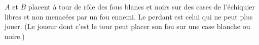 $A$ et $B$ placent à tour de rôle des fous blancs et noirs sur des cases de l'échiquier libres et non menacées par un fou ennemi. Le perdant est celui qui ne peut plus jouer. (Le joueur dont c'est le tour peut placer son fou sur une case blanche ou noire.)
